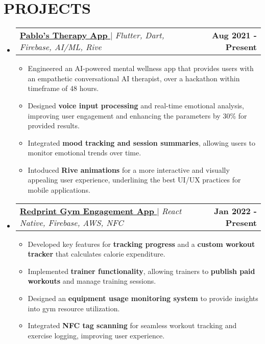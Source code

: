\documentclass[letterpaper,10pt]{article}
\makeatletter
\newcommand{\resumeItem}[1]{
  \item\small{
    {#1 \vspace{-2pt}}
  }
}
\newcommand{\resumeProjectHeading}[2]{
  \item
    \begin{tabular*}{1.001\textwidth}{l@{\extracolsep{\fill}}r}
      \small#1 & \textbf{\small #2}\\
    \end{tabular*}\vspace{-7pt}
}
\newcommand{\resumeSubHeadingListStart}{\begin{itemize}[leftmargin=0.0in, label={}]}
\newcommand{\resumeSubHeadingListEnd}{\end{itemize}}
\newcommand{\resumeItemListStart}{\begin{itemize}}
\newcommand{\resumeItemListEnd}{\end{itemize}\vspace{-5pt}}
\makeatother
\begin{document}
\section{PROJECTS}
\resumeSubHeadingListStart
  \resumeProjectHeading {\href{https://github.com/yourusername/therapy-ai-app}{\textbf{\large{Pablo's Therapy App}} \href{https://github.com/yourusername/therapy-ai-app}{\raisebox{-0.1\height}\faExternalLink }} $|$ \textit{\normalsize{Flutter, Dart, Firebase, AI/ML, Rive}}}{Aug 2021 - Present}
  \resumeItemListStart
    \resumeItem{\normalsize{Engineered an AI-powered mental wellness app that provides users with an empathetic conversational AI therapist, over a hackathon within timeframe of 48 hours.}}
    \resumeItem{\normalsize{Designed \textbf{voice input processing} and real-time emotional analysis, improving user engagement and enhancing the parameters by 30\% for provided results.}}
    \resumeItem{\normalsize{Integrated \textbf{mood tracking and session summaries}, allowing users to monitor emotional trends over time.}}
    \resumeItem{\normalsize{Intoduced \textbf{Rive animations} for a more interactive and visually appealing user experience, underlining the best UI/UX practices for mobile applications.}}
  \resumeItemListEnd\vspace{-12pt}
  \resumeProjectHeading {\href{https://www.redprintfit.com/}{\textbf{\large{Redprint Gym Engagement App}} \href{https://www.redprintfit.com/}{\raisebox{-0.1\height}\faExternalLink }} $|$ \textit{\normalsize{React Native, Firebase, AWS, NFC}}}{Jan 2022 - Present}
  \resumeItemListStart
    \resumeItem{\normalsize{Developed key features for \textbf{tracking progress} and a \textbf{custom workout tracker} that calculates calorie expenditure.}}
    \resumeItem{\normalsize{Implemented \textbf{trainer functionality}, allowing trainers to \textbf{publish paid workouts} and manage training sessions.}}
    \resumeItem{\normalsize{Designed an \textbf{equipment usage monitoring system} to provide insights into gym resource utilization.}}
    \resumeItem{\normalsize{Integrated \textbf{NFC tag scanning} for seamless workout tracking and exercise logging, improving user experience.}}
  \resumeItemListEnd
\resumeSubHeadingListEnd
\vspace{-12pt}
\end{document}
